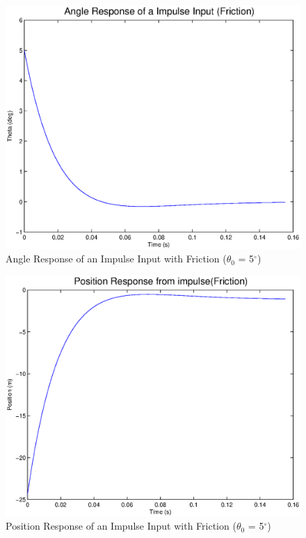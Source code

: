 \documentclass{article}
\begin{document}
\begin{figure}[!htb]
    \centering
    \includegraphics[scale=0.6]{6}
    \caption{Angle Response of an Impulse Input with Friction ($\theta_0$ = 5$^{\circ}$)}
\end{figure} 

\begin{figure}[!htb]
    \centering
    \includegraphics[scale=0.6]{7}
    \caption{Position Response of an Impulse Input with Friction ($\theta_0$ = 5$^{\circ}$)}
\end{figure} 
\end{document}
